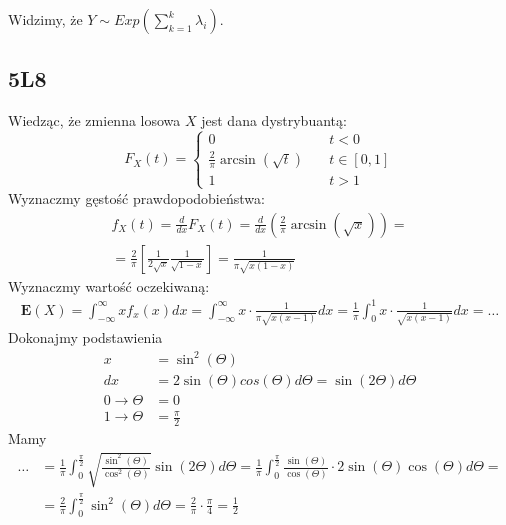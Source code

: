 \documentclass{article}
\begin{document}
\noindent
Widzimy, że $Y\sim Exp(\sum_{k=1}^{k} \lambda_i)$.

\subsection{5L8}

Wiedząc, że zmienna losowa $X$ jest dana dystrybuantą:
\[
F_X(t) = \begin{cases}
    0 \quad & t < 0 \\
    \frac{2}{\pi} \arcsin(\sqrt{t}) \quad & t\in[0,1] \\
    1 \quad & t > 1
\end{cases}
\]
Wyznaczmy gęstość prawdopodobieństwa:
\begin{align}
    f_X(t) = \frac{d}{dx} F_X(t) = \frac{d}{dx} \left(\frac{2}{\pi} \arcsin(\sqrt{x}) \right) =\\
    = \frac{2}{\pi} \left[\frac{1}{2\sqrt{x}} \frac{1}{\sqrt{1-x}} \right]
    = \frac{1}{\pi\sqrt{x(1-x)}}
\end{align}
Wyznaczmy wartość oczekiwaną:
\begin{align}
    \mathbf{E}(X) = \int_{-\infty}^{\infty} x f_x(x) dx
    = \int_{-\infty}^{\infty} x\cdot \frac{1}{\pi\sqrt{x(x-1)}} dx
    = \frac{1}{\pi} \int_{0}^{1} x\cdot \frac{1}{\sqrt{x(x-1)}} dx = \dots
\end{align}
Dokonajmy podstawienia
\begin{align}
    x &= \sin^2(\Theta)\\
    dx &= 2\sin(\Theta)cos(\Theta)d\Theta = \sin(2\Theta)d\Theta\\
    0 \rightarrow \Theta&=0 \\
    1 \rightarrow \Theta&=\frac{\pi}{2}
\end{align}
Mamy
\begin{align}
    \dots &= \frac{1}{\pi} \int_{0}^{\frac{\pi}{2}} \sqrt{\frac{\sin^2(\Theta)}{\cos^2(\Theta)}} \sin(2\Theta) d\Theta
    = \frac{1}{\pi} \int_{0}^{\frac{\pi}{2}} \frac{\sin(\Theta)}{\cos(\Theta)} \cdot 2\sin(\Theta)\cos(\Theta) d\Theta =\\
    &= \frac{2}{\pi} \int_{0}^{\frac{\pi}{2}} \sin^2(\Theta) d\Theta
    = \frac{2}{\pi} \cdot \frac{\pi}{4} = \frac{1}{2}
\end{align}
\end{document}
